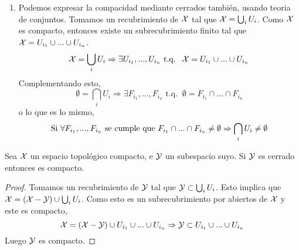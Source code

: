 \begin{obs}
\begin{enumerate}
\begin{proof}
\begin{enumerate}
				\item[\bla] Sea $\A'=\{A'_{i}\}$ un cubrimiento de $\Y$ por abiertos de $\Y$. Para cada $i$ podemos elegir un conjunto $A_i$ abierto en $\X$ tal que 
					\begin{equation*}
							\A'_i=A_i \cap \Y
					\end{equation*}
					La colección formada por estos $A_i$ a la que llamaremos $\A$ es un recubrimiento de $\Y$ por abiertos de $\A$. Por hipótesis, existe algun subrecubrimiento finito $\{A_{i_1},...,A_{i_n}\}$ que cubre $\Y$. Entonces $\{A'_{i_1},...,A'_{i_n}\}$ es una subrecubrimiento finito de $\Y$, luego $\Y$ es compacto. \qedhere
			\end{enumerate}
		\end{proof}
		\item Podemos expresar la compacidad mediante cerrados también, usando teoria de conjuntos.
		Tomamos un recubrimiento de $\X$ tal que $\mathcal{X} = \bigcup_{i}U_i$. Como $\X$ es compacto, entonces existe un subrecubrimiento finito tal que $\mathcal{X} = U_{i_1} \cup ... \cup U_{i_n}$.
		\begin{equation*}
			\mathcal{X} = \bigcup_{i}U_i \Rightarrow \exists U_{i_1},..., U_{i_n} \text{ t.q. }\ \mathcal{X} = U_{i_1} \cup ... \cup U_{i_n}
		\end{equation*}
		Complementando esto,
		\begin{equation*}
			\emptyset = \bigcap_{i}U_i \Rightarrow \exists F_{i_1},..., F_{i_n} \text{ t.q. }\ \emptyset = F_{i_1} \cap ... \cap F_{i_n}
		\end{equation*}
		o lo que es lo mismo,
		\begin{equation*}
			 \text{Si } \forall F_{i_1},..., F_{i_n} \text{ se cumple que } F_{i_1} \cap ... \cap F_{i_n} \neq \emptyset  \Rightarrow \bigcap_{i}U_i \neq \emptyset	\qedhere
		\end{equation*}
	\end{enumerate}
\end{obs}


\begin{prop}
	\label{cerra_en_comp_comp}
	Sea $\X$ un espacio topológico compacto, e $\Y$ un subespacio suyo. Si $\Y$ es cerrado entonces es compacto.
	\begin{proof}
		Tomamos un recubrimiento de $\Y$ tal que $\mathcal{Y} \subset \bigcup_{i}U_i$. Esto implica que $\mathcal{X} = (\mathcal{X}-\mathcal{Y}) \cup \bigcup_{i}U_i$. Como esto es un subrecubrimiento por abiertos de $\X$ y este es compacto,
		\begin{equation*}
			\mathcal{X} = (\mathcal{X}-\mathcal{Y}) \cup U_{i_1} \cup ... \cup U_{i_n} \Rightarrow \mathcal{Y} \subset U_{i_1} \cup ... \cup U_{i_n}
		\end{equation*}
		Luego $\Y$ es compacto.
	\end{proof}
\end{prop}


